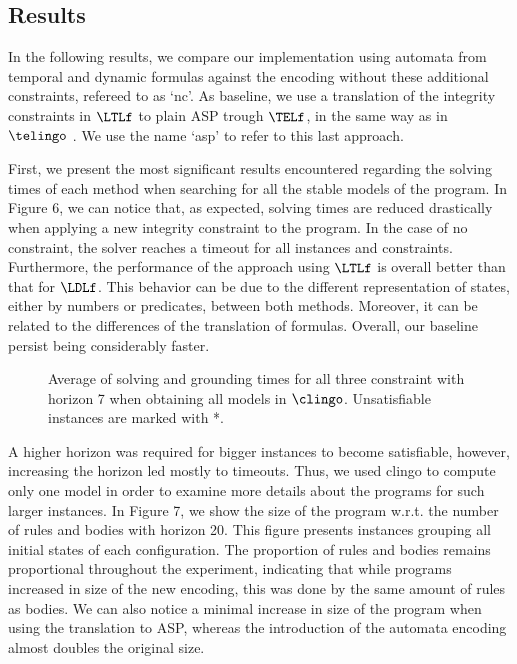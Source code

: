 \subsection{Results}


In the following results, we compare our implementation using automata from temporal and dynamic formulas against the encoding without these additional constraints, refereed to as `nc'. As baseline, we use a translation of the integrity constraints in $\LTLf$ to plain ASP trough $\TELf$, in the same way as in $\telingo$ \cite{cakamosc19a}. We use the name `asp' to refer to this last approach.

First, we present the most significant results encountered regarding the solving times of each method when searching for all the stable models of the program. In Figure 6, we can notice that, as expected, solving times are reduced drastically when applying a new integrity constraint to the program. In the case of no constraint, the solver reaches a timeout for all instances and constraints. Furthermore, the performance of the approach using $\LTLf$ is overall better than that for $\LDLf$. This behavior can be due to the different representation of states, either by numbers or predicates, between both methods. Moreover, it can be related to the differences of the translation of formulas. Overall, our baseline persist being considerably faster.



\begin{figure}[]
    \centering
    
    
    \caption{Average of solving and grounding times for all three constraint with horizon 7 when obtaining all models in $\clingo$. Unsatisfiable instances are marked with *.}
\end{figure}

A higher horizon was required for bigger instances to become satisfiable, however, increasing the horizon led mostly to timeouts. Thus, we used clingo to compute only one model in order to examine more details about the programs for such larger instances. In Figure 7, we show the size of the program w.r.t. the number of rules and bodies with horizon 20. This figure presents instances grouping all initial states of each configuration. The proportion of rules and bodies remains proportional throughout the experiment, indicating that while programs increased in size of the new encoding, this was done by the same amount of rules as bodies. 
We can also notice a minimal increase in size of the program when using the translation to ASP, whereas the introduction of the automata encoding almost doubles the original size.


